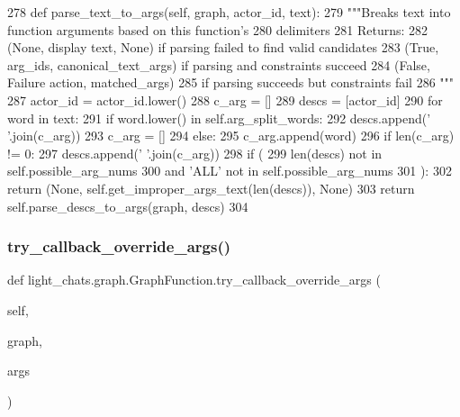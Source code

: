 \begin{DoxyCode}
278     \textcolor{keyword}{def }parse\_text\_to\_args(self, graph, actor\_id, text):
279         \textcolor{stringliteral}{"""Breaks text into function arguments based on this function's}
280 \textcolor{stringliteral}{        delimiters}
281 \textcolor{stringliteral}{        Returns:}
282 \textcolor{stringliteral}{        (None, display text, None) if parsing failed to find valid candidates}
283 \textcolor{stringliteral}{        (True, arg\_ids, canonical\_text\_args) if parsing and constraints succeed}
284 \textcolor{stringliteral}{        (False, Failure action, matched\_args)}
285 \textcolor{stringliteral}{                if parsing succeeds but constraints fail}
286 \textcolor{stringliteral}{        """}
287         actor\_id = actor\_id.lower()
288         c\_arg = []
289         descs = [actor\_id]
290         \textcolor{keywordflow}{for} word \textcolor{keywordflow}{in} text:
291             \textcolor{keywordflow}{if} word.lower() \textcolor{keywordflow}{in} self.arg\_split\_words:
292                 descs.append(\textcolor{stringliteral}{' '}.join(c\_arg))
293                 c\_arg = []
294             \textcolor{keywordflow}{else}:
295                 c\_arg.append(word)
296         \textcolor{keywordflow}{if} len(c\_arg) != 0:
297             descs.append(\textcolor{stringliteral}{' '}.join(c\_arg))
298         \textcolor{keywordflow}{if} (
299             len(descs) \textcolor{keywordflow}{not} \textcolor{keywordflow}{in} self.possible\_arg\_nums
300             \textcolor{keywordflow}{and} \textcolor{stringliteral}{'ALL'} \textcolor{keywordflow}{not} \textcolor{keywordflow}{in} self.possible\_arg\_nums
301         ):
302             \textcolor{keywordflow}{return} (\textcolor{keywordtype}{None}, self.get\_improper\_args\_text(len(descs)), \textcolor{keywordtype}{None})
303         \textcolor{keywordflow}{return} self.parse\_descs\_to\_args(graph, descs)
304 
\end{DoxyCode}
\mbox{\label{classlight__chats_1_1graph_1_1GraphFunction_a9769b13542f28f04977e374057bbc017}} 
\subsubsection{\texorpdfstring{try\+\_\+callback\+\_\+override\+\_\+args()}{try\_callback\_override\_args()}}
{\footnotesize\ttfamily def light\+\_\+chats.\+graph.\+Graph\+Function.\+try\+\_\+callback\+\_\+override\+\_\+args (\begin{DoxyParamCaption}\item[{}]{self,  }\item[{}]{graph,  }\item[{}]{args }\end{DoxyParamCaption})}



